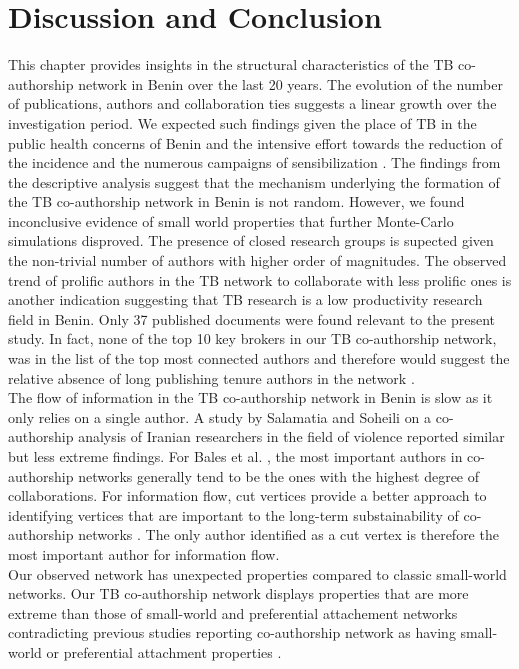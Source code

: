 \section{Discussion and Conclusion}
\label{sec:tb_discussion}
This chapter provides insights in the structural characteristics of the TB co-authorship network in Benin over the last 20 years. The evolution of the number of publications, authors and collaboration ties suggests a linear growth over the investigation period. We expected such findings given the place of TB in the public health concerns of Benin and the intensive effort towards the reduction of the incidence and the numerous campaigns of sensibilization \cite{world_health_organization_atlas_2016}. The findings from the descriptive analysis suggest that the mechanism underlying the formation of the TB co-authorship network in Benin is not random. However, we found inconclusive evidence of small world properties that further Monte-Carlo simulations disproved. The presence of closed research groups is supected given the non-trivial number of authors with higher order of magnitudes. The observed trend of prolific authors in the TB network to collaborate with less prolific ones is another indication suggesting that TB research is a low productivity research field in Benin. Only 37 published documents were found relevant to the present study. In fact, none of the top 10 key brokers in our TB co-authorship network, was in the list of the top most connected authors and therefore would suggest the relative absence of long publishing tenure authors in the network \cite{li_co-authorship_2013}. \\
The flow of information in the TB co-authorship network in Benin is slow as it only relies on a single author. A study by Salamatia and Soheili \cite{salamati_social_2016} on a co-authorship analysis of Iranian researchers in the field of violence reported similar but less extreme findings. For Bales et al. \cite{bales_social_2008,bales_evolution_2011}, the most important authors in co-authorship networks generally tend to be the ones with the highest degree of collaborations. For information flow, cut vertices provide a better approach to identifying vertices that are important to the long-term substainability of co-authorship networks \cite{kolaczyk_statistical_2014}. The only author identified as a cut vertex is therefore the most important author for information flow.\\
Our observed network has unexpected properties compared to classic small-world networks. Our TB co-authorship network displays properties that are more extreme than those of small-world and preferential attachement networks contradicting previous studies reporting co-authorship network as having small-world or preferential attachment properties \cite{gonzalez-alcaide_scientific_2012,wagner_network_2005}.\\
